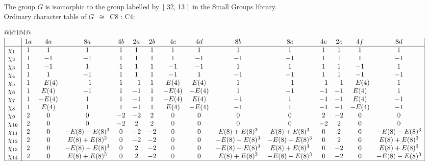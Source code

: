 \documentclass[varwidth=\maxdimen,border=10]{standalone}
\begin{document}
The group $G$ is isomorphic to the group labelled by\ [ 32, 13 ]\ in the Small Groups library.\\
Ordinary character table of $G$\ $\cong$\ C8 : C4:\\
\begin{center}
\begin{tabular}{@{}l@{}l@{}l@{}}
\hline
\(\begin{array}{|l|cccccccccccccc|}
  & 1a & 4a & 8a & 4b & 2a & 2b & 4c & 4d & 8b & 8c & 4e & 2c & 4f & 8d\\ \hline
\chi_{1} & 1 & 1 & 1 & 1 & 1 & 1 & 1 & 1 & 1 & 1 & 1 & 1 & 1 & 1\\
\chi_{2} & 1 & -1 & -1 & 1 & 1 & 1 & 1 & -1 & -1 & -1 & 1 & 1 & 1 & -1\\
\chi_{3} & 1 & -1 & 1 & 1 & 1 & 1 & -1 & -1 & 1 & 1 & 1 & 1 & -1 & 1\\
\chi_{4} & 1 & 1 & -1 & 1 & 1 & 1 & -1 & 1 & -1 & -1 & 1 & 1 & -1 & -1\\
\chi_{5} & 1 & -E(4) & -1 & 1 & -1 & 1 & E(4) & E(4) & 1 & -1 & -1 & -1 & -E(4) & 1\\
\chi_{6} & 1 & E(4) & -1 & 1 & -1 & 1 & -E(4) & -E(4) & 1 & -1 & -1 & -1 & E(4) & 1\\
\chi_{7} & 1 & -E(4) & 1 & 1 & -1 & 1 & -E(4) & E(4) & -1 & 1 & -1 & -1 & E(4) & -1\\
\chi_{8} & 1 & E(4) & 1 & 1 & -1 & 1 & E(4) & -E(4) & -1 & 1 & -1 & -1 & -E(4) & -1\\
\chi_{9} & 2 & 0 & 0 & -2 & -2 & 2 & 0 & 0 & 0 & 0 & 2 & -2 & 0 & 0\\
\chi_{10} & 2 & 0 & 0 & -2 & 2 & 2 & 0 & 0 & 0 & 0 & -2 & 2 & 0 & 0\\
\chi_{11} & 2 & 0 & -E(8)-E(8)^{3} & 0 & -2 & -2 & 0 & 0 & E(8)+E(8)^{3} & E(8)+E(8)^{3} & 0 & 2 & 0 & -E(8)-E(8)^{3}\\
\chi_{12} & 2 & 0 & E(8)+E(8)^{3} & 0 & -2 & -2 & 0 & 0 & -E(8)-E(8)^{3} & -E(8)-E(8)^{3} & 0 & 2 & 0 & E(8)+E(8)^{3}\\
\chi_{13} & 2 & 0 & -E(8)-E(8)^{3} & 0 & 2 & -2 & 0 & 0 & -E(8)-E(8)^{3} & E(8)+E(8)^{3} & 0 & -2 & 0 & E(8)+E(8)^{3}\\
\chi_{14} & 2 & 0 & E(8)+E(8)^{3} & 0 & 2 & -2 & 0 & 0 & E(8)+E(8)^{3} & -E(8)-E(8)^{3} & 0 & -2 & 0 & -E(8)-E(8)^{3}\\
\hline
\end{array}\)\\
\end{tabular}
\end{center}
\end{document}

